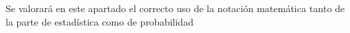 \documentclass[addpoints,spanish, 12pt,a4paper]{exam}
\begin{document}
\begin{questions}

\question[1] Se valorará en este apartado el correcto uso de la notación matemática tanto de la parte de estadística como de probabilidad


\end{questions}
\end{document}
